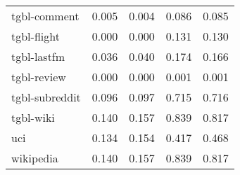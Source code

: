 \begin{tabular}{lllll}
tgbl-comment       &          0.005 &          0.004 &         0.086 &         0.085 \\
tgbl-flight        &          0.000 &          0.000 &         0.131 &         0.130 \\
tgbl-lastfm        &          0.036 &          0.040 &         0.174 &         0.166 \\
tgbl-review        &          0.000 &          0.000 &         0.001 &         0.001 \\
tgbl-subreddit     &          0.096 &          0.097 &         0.715 &         0.716 \\
tgbl-wiki          &          0.140 &          0.157 &         0.839 &         0.817 \\
uci                &          0.134 &          0.154 &         0.417 &         0.468 \\
wikipedia          &          0.140 &          0.157 &         0.839 &         0.817 \\
\bottomrule
\end{tabular}